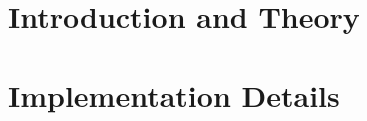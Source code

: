 \documentclass[11pt,a4paper,bibtotoc,idxtotoc,headsepline,footsepline,footexclude,BCOR12mm,DIV13]{scrbook}
\begin{document}
	\frontmatter
	
	
	
%	
%	
	
	
%	
	\clearemptydoublepage
	
	
	
	\newpage
	
	\newpage
	
	
	
	
	

	\tableofcontents
  

	\mainmatter
	
		\part[Introduction and Theory]{Introduction and Theory}
		\label{part:introAndBackgroundTheory}
		
		
		
     	
		
		
		\part[Implementation]{Implementation Details}
		\label{part:implementation}
		 
		 
		
		
		
		
		
		
		
		
%		
%		
%		
		
	


  \clearemptydoublepage
  
	
	
 
\end{document}
